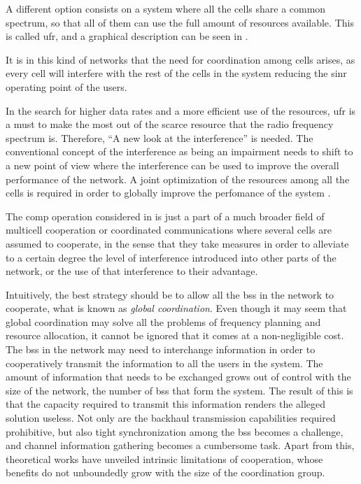 A different option consists on a system where all the cells share a common
spectrum, so that all of them can use the full amount of resources available.
This is called \gls{ufr}, and a graphical description can be seen in
.

It is in this kind of networks that the need for coordination among cells
arises, as every cell will interfere with the rest of the cells in the system
reducing the \gls{sinr} operating point of the users.

In the search for higher data rates and a more efficient use of the resources,
\gls{ufr} is a must to make the most out of the scarce resource that the radio
frequency spectrum is. Therefore, ``A new look at the interference''
\cite{gesbert10} is needed. The conventional concept of the interference as
being an impairment needs to shift to a new point of view where the interference
can be used to improve the overall performance of the network. A joint
optimization of the resources among all the cells is required in order to
globally improve the perfomance of the system \cite{gesbert07}.

The \gls{comp} operation considered in \cite{3gpprel11} is just a part of a much
broader field of multicell cooperation or coordinated communications where
several cells are assumed to cooperate, in the sense that they take measures in
order to alleviate to a certain degree the level of interference introduced into
other parts of the network, or the use of that interference to their advantage.

Intuitively, the best strategy should be to allow all the \glspl{bs} in the
network to cooperate, what is known as \emph{global coordination}. Even though
it may seem that global coordination may solve all the problems of frequency
planning and resource allocation, it cannot be ignored that it comes at a
non-negligible cost. The \glspl{bs} in the network may need to interchange
information in order to cooperatively transmit the information to all the users
in the system. The amount of information that needs to be exchanged grows out of
control with the size of the network, \ie the number of \glspl{bs} that form the
system. The result of this is that the capacity required to transmit this
information renders the alleged solution useless. Not only are the backhaul
transmission capabilities required prohibitive, but also tight synchronization
among the \glspl{bs} becomes a challenge, and channel information gathering
becomes a cumbersome task. Apart from this, theoretical works \cite{lozano13}
have unveiled intrinsic limitations of cooperation, whose benefits do not
unboundedly grow with the size of the coordination group.

